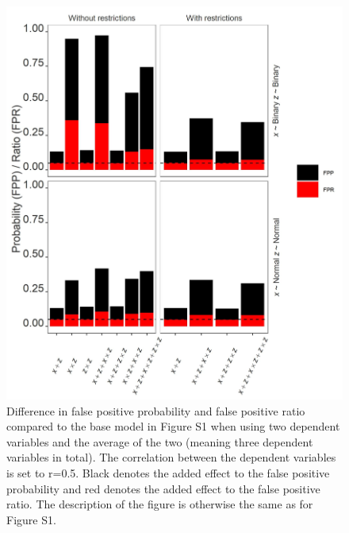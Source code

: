 \begin{figure}[hbt!]
\includegraphics{R/Analysis/Result/Figures/Figure3SI.jpeg}
\centering
\caption{Difference in false positive probability and false positive ratio compared to the base model in Figure S1 when using two dependent variables and the average of the two (meaning three dependent variables in total). The correlation between the dependent variables is set to r=0.5. Black denotes the added effect to the false positive probability and red denotes the added effect to the false positive ratio.  The description of the figure is otherwise the same as for Figure S1.}
\label{fig:mainfigure}
\end{figure}


